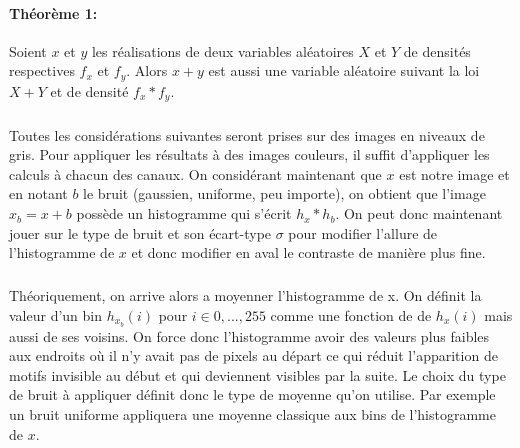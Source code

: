 \documentclass{report}
\begin{document}
\paragraph{Théorème 1:} Soient $x$ et $y$ les réalisations de deux variables aléatoires $X$ et $Y$ de densités respectives $f_x$ et $f_y$. Alors $x+y$ est aussi une variable aléatoire suivant la loi $X+Y$ et de densité $f_x * f_y$.
\subparagraph{} Toutes les considérations suivantes seront prises sur des images en niveaux de gris. Pour appliquer les résultats à des images couleurs, il suffit d'appliquer les calculs à chacun des canaux. On considérant maintenant que $x$ est notre image et en notant $b$ le bruit (gaussien, uniforme, peu importe), on obtient que l'image $x_b = x+b$ possède un histogramme qui s'écrit $h_x * h_b$. On peut donc maintenant jouer sur le type de bruit et son écart-type $\sigma$ pour modifier l'allure de l'histogramme  de $x$ et donc modifier en aval le contraste de manière plus fine.
\subparagraph*{} Théoriquement, on arrive alors a moyenner l'histogramme de x. On définit la valeur d'un bin $h_x_b(i)$ pour $i \in {0,...,255}$ comme une fonction de de $h_x(i)$ mais aussi de ses voisins. On force donc l'histogramme avoir des valeurs plus faibles aux endroits où il n'y avait pas de pixels au départ ce qui réduit l'apparition de motifs invisible au début et qui deviennent visibles par la suite. Le choix du type de bruit à appliquer définit donc le type de moyenne qu'on utilise. Par exemple un bruit uniforme appliquera une moyenne classique aux bins de l'histogramme de $x$.
\end{document}
